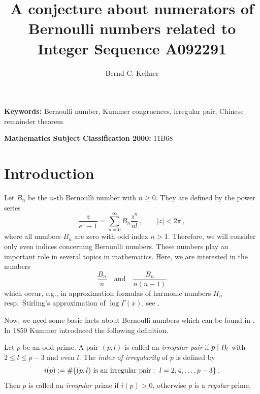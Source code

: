 \documentclass[12pt,english]{article}
\begin{document}
\nocite{*}

\title{A conjecture about numerators of Bernoulli numbers related to Integer Sequence A092291}
\author{Bernd C. Kellner}
\date{}
\maketitle
\vspace*{-0.8cm}

\smallskip

\textbf{Keywords:} Bernoulli number, Kummer congruences, irregular pair,
Chinese remainder theorem
\smallskip

\textbf{Mathematics Subject Classification 2000:} 11B68

\parindent 0cm

\section{Introduction}

Let $B_n$ be the $n$-th Bernoulli number with $n \geq 0$. They are defined by
the power series
\[
  \frac{z}{e^z-1} = \sum_{n=0}^\infty B_n \frac{z^n}{n!} \,,
  \qquad |z| < 2 \pi \,,
\]
where all numbers $B_n$ are zero with odd index $n > 1$.
Therefore, we will consider only even indices concerning Bernoulli numbers.
These numbers play an important role in several topics in mathematics. Here,
we are interested in the numbers
\[
    \frac{B_n}{n} \quad \mbox{and} \quad \frac{B_n}{n(n-1)}
\]
which occur, e.g., in approximation formulas of harmonic numbers $H_n$ resp.\
Stirling's approximation of $\log \Gamma(x)$, see \cite[pp.~480--482]{graham94concrete}.
\medskip

Now, we need some basic facts about Bernoulli numbers
which can be found in \cite[Chapter 15]{ireland90classical}.
In 1850 Kummer introduced the following definition.
\begin{defin} \label{def-irrpair}
Let $p$ be an odd prime. A pair $(p,l)$ is called an \textsl{irregular pair} if $p \mid B_l$
with $2 \leq l \leq p-3$ and even $l$.
The \textsl{index of irregularity} of $p$ is defined by
\[
    i(p) := \# \{ (p,l) \mbox{\ is an irregular pair} \sep l = 2, 4, \ldots, p-3 \} \,.
\]
Then $p$ is called an \textsl{irregular} prime if $i(p) > 0$, otherwise $p$ is a \textsl{regular}
prime.
\end{defin}
\medskip
\end{document}
